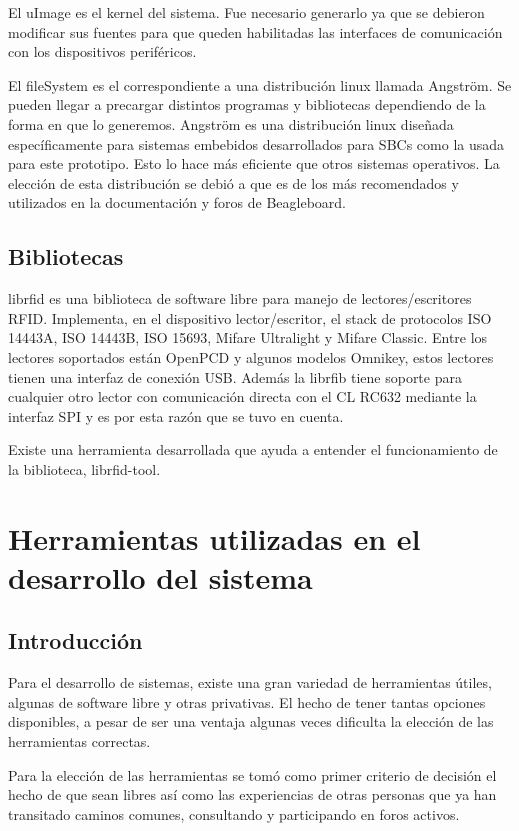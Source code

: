 El uImage es el kernel del sistema. Fue necesario generarlo ya que se debieron modificar sus fuentes para que queden habilitadas las interfaces de comunicación con los dispositivos periféricos.

El fileSystem es el correspondiente a una distribución linux llamada Angström. Se pueden llegar a precargar distintos programas y bibliotecas dependiendo de la forma en que lo generemos.
Angström es una distribución linux diseñada específicamente para sistemas embebidos desarrollados
para SBCs como la usada para este prototipo. Esto lo hace más eficiente que otros sistemas operativos. La elección de esta distribución se debió a que es de los más recomendados y utilizados en la documentación y foros de Beagleboard.

\subsection{Bibliotecas}
librfid es una biblioteca de software libre para manejo de lectores/escritores RFID. Implementa, en el dispositivo lector/escritor, el stack de protocolos ISO 14443A, ISO 14443B, ISO 15693, Mifare Ultralight y Mifare Classic.
Entre los lectores soportados están OpenPCD y algunos modelos Omnikey, estos lectores tienen  una interfaz de conexión USB. Además la librfib tiene soporte para cualquier otro lector con comunicación directa con el CL RC632 mediante la interfaz SPI y es por esta razón que se tuvo en cuenta.

\bigskip
Existe una herramienta desarrollada que ayuda a entender el funcionamiento de la biblioteca, librfid-tool.

\section{Herramientas utilizadas en el desarrollo del sistema}

\subsection{Introducción}
Para el desarrollo de sistemas, existe una gran variedad de herramientas útiles, algunas de software libre y otras privativas. El hecho de tener tantas opciones disponibles, a pesar de ser una ventaja algunas veces dificulta la elección de las herramientas correctas.

Para la elección de las herramientas se tomó como primer criterio de decisión el hecho de que sean libres así como las experiencias de otras personas que ya han transitado caminos comunes, consultando y participando en foros activos.

